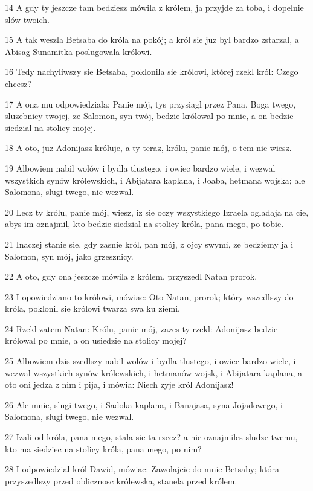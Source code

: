 \par 14 A gdy ty jeszcze tam bedziesz mówila z królem, ja przyjde za toba, i dopelnie slów twoich.
\par 15 A tak weszla Betsaba do króla na pokój; a król sie juz byl bardzo zstarzal, a Abisag Sunamitka poslugowala królowi.
\par 16 Tedy nachyliwszy sie Betsaba, poklonila sie królowi, której rzekl król: Czego chcesz?
\par 17 A ona mu odpowiedziala: Panie mój, tys przysiagl przez Pana, Boga twego, sluzebnicy twojej, ze Salomon, syn twój, bedzie królowal po mnie, a on bedzie siedzial na stolicy mojej.
\par 18 A oto, juz Adonijasz króluje, a ty teraz, królu, panie mój, o tem nie wiesz.
\par 19 Albowiem nabil wolów i bydla tlustego, i owiec bardzo wiele, i wezwal wszystkich synów królewskich, i Abijatara kaplana, i Joaba, hetmana wojska; ale Salomona, slugi twego, nie wezwal.
\par 20 Lecz ty królu, panie mój, wiesz, iz sie oczy wszystkiego Izraela ogladaja na cie, abys im oznajmil, kto bedzie siedzial na stolicy króla, pana mego, po tobie.
\par 21 Inaczej stanie sie, gdy zasnie król, pan mój, z ojcy swymi, ze bedziemy ja i Salomon, syn mój, jako grzesznicy.
\par 22 A oto, gdy ona jeszcze mówila z królem, przyszedl Natan prorok.
\par 23 I opowiedziano to królowi, mówiac: Oto Natan, prorok; który wszedlszy do króla, poklonil sie królowi twarza swa ku ziemi.
\par 24 Rzekl zatem Natan: Królu, panie mój, zazes ty rzekl: Adonijasz bedzie królowal po mnie, a on usiedzie na stolicy mojej?
\par 25 Albowiem dzis szedlszy nabil wolów i bydla tlustego, i owiec bardzo wiele, i wezwal wszystkich synów królewskich, i hetmanów wojsk, i Abijatara kaplana, a oto oni jedza z nim i pija, i mówia: Niech zyje król Adonijasz!
\par 26 Ale mnie, slugi twego, i Sadoka kaplana, i Banajasa, syna Jojadowego, i Salomona, slugi twego, nie wezwal.
\par 27 Izali od króla, pana mego, stala sie ta rzecz? a nie oznajmiles sludze twemu, kto ma siedziec na stolicy króla, pana mego, po nim?
\par 28 I odpowiedzial król Dawid, mówiac: Zawolajcie do mnie Betsaby; która przyszedlszy przed oblicznosc królewska, stanela przed królem.
